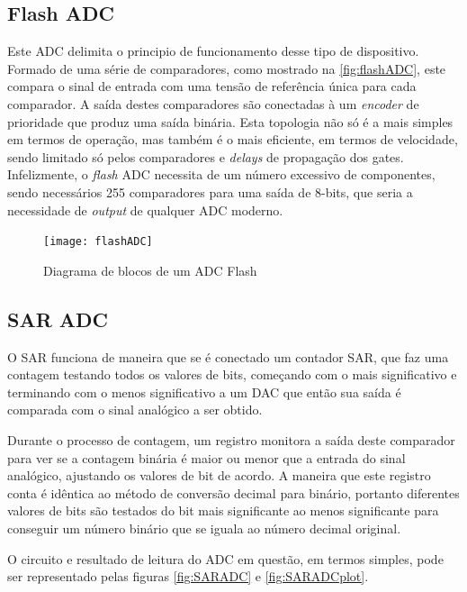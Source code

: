 \subsection{Flash ADC}\label{flashADC}

Este \gls{ADC} delimita o principio de funcionamento desse tipo de dispositivo. Formado de uma série de comparadores, como mostrado na \autoref{fig:flashADC}, este compara o sinal de entrada com uma tensão de referência única para cada comparador. A saída destes comparadores são conectadas à um \textit{encoder} de prioridade que produz uma saída binária.
Esta topologia não só é a mais simples em termos de operação, mas também é o mais eficiente, em termos de velocidade, sendo limitado só pelos comparadores e \textit{delays} de propagação dos gates. Infelizmente, o \textit{flash} \gls{ADC} necessita de um número excessivo de componentes, sendo necessários 255 comparadores para uma saída de 8-bits, que seria a necessidade de \textit{output} de qualquer \gls{ADC} moderno.

\begin{figure}[htb!]%
    \caption{Diagrama de blocos de um ADC Flash}%
    \label{fig:flashADC}%
    \texttt{[image: flashADC]}%
\end{figure}

\subsection{SAR ADC}\label{SARADC}
O \gls{SAR} funciona de maneira que se é conectado um contador \gls{SAR}, que faz uma contagem testando todos os valores de bits, começando com o mais significativo e terminando com o menos significativo a um \gls{DAC} que então sua saída é comparada com o sinal analógico a ser obtido.

Durante o processo de contagem, um registro monitora a saída deste comparador para ver se a contagem binária é maior ou menor que a entrada do sinal analógico, ajustando os valores de bit de acordo. A maneira que este registro conta é idêntica ao método de conversão decimal para binário, portanto diferentes valores de bits são testados do bit mais significante ao menos significante para conseguir um número binário que se iguala ao número decimal original.

O circuito e resultado de leitura do \gls{ADC} em questão, em termos simples, pode ser representado pelas figuras \ref{fig:SARADC} e \ref{fig:SARADCplot}.

